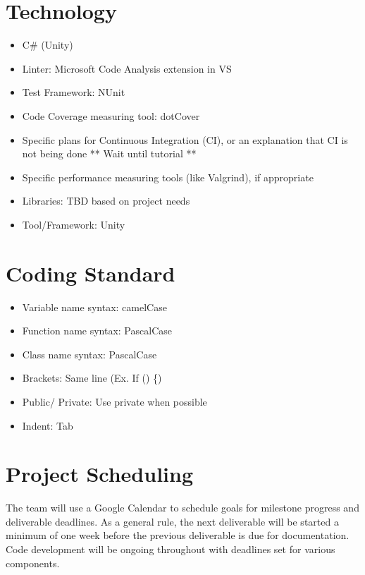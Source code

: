 \documentclass{article}
\begin{document}
\section{Technology}

\begin{itemize}
\item C\# (Unity)
\item Linter: Microsoft Code Analysis extension in VS
\item Test Framework: NUnit
\item Code Coverage measuring tool: dotCover
\item Specific plans for Continuous Integration (CI), or an explanation that CI is not being done ** Wait until tutorial **
\item Specific performance measuring tools (like Valgrind), if
  appropriate
\item Libraries: TBD based on project needs
\item Tool/Framework: Unity
\end{itemize}

\section{Coding Standard}
\begin{itemize}
    \item Variable name syntax: camelCase
    \item Function name syntax: PascalCase
    \item Class name syntax: PascalCase
    \item Brackets: Same line (Ex. If () \{)
    \item Public/ Private: Use private when possible
    \item Indent: Tab 
\end{itemize}

\section{Project Scheduling}

The team will use a Google Calendar to schedule goals for milestone progress and deliverable deadlines. As a general rule, the next deliverable will be started a minimum of one week before the previous deliverable is due for documentation. Code development will be ongoing throughout with deadlines set for various components.
\end{document}
